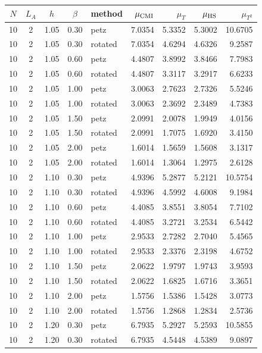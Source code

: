 \documentclass[11pt]{article}
\begin{document}
\begin{table}[htbp]
\centering
\scriptsize
\begin{tabular}{cccclrrrr}
\toprule
$N$ & $L_A$ & $h$ & $\beta$ & method & $\mu_{\rm CMI}$ & $\mu_T$ & $\mu_{\rm HS}$ & $\mu_{T^2}$\\
\midrule
10 & 2 & 1.05 & 0.30 & petz & 7.0354 & 5.3352 & 5.3002 & 10.6705\\
10 & 2 & 1.05 & 0.30 & rotated & 7.0354 & 4.6294 & 4.6326 & 9.2587\\
10 & 2 & 1.05 & 0.60 & petz & 4.4807 & 3.8992 & 3.8466 & 7.7983\\
10 & 2 & 1.05 & 0.60 & rotated & 4.4807 & 3.3117 & 3.2917 & 6.6233\\
10 & 2 & 1.05 & 1.00 & petz & 3.0063 & 2.7623 & 2.7326 & 5.5246\\
10 & 2 & 1.05 & 1.00 & rotated & 3.0063 & 2.3692 & 2.3489 & 4.7383\\
10 & 2 & 1.05 & 1.50 & petz & 2.0991 & 2.0078 & 1.9949 & 4.0156\\
10 & 2 & 1.05 & 1.50 & rotated & 2.0991 & 1.7075 & 1.6920 & 3.4150\\
10 & 2 & 1.05 & 2.00 & petz & 1.6014 & 1.5659 & 1.5608 & 3.1317\\
10 & 2 & 1.05 & 2.00 & rotated & 1.6014 & 1.3064 & 1.2975 & 2.6128\\
10 & 2 & 1.10 & 0.30 & petz & 4.9396 & 5.2877 & 5.2121 & 10.5754\\
10 & 2 & 1.10 & 0.30 & rotated & 4.9396 & 4.5992 & 4.6008 & 9.1984\\
10 & 2 & 1.10 & 0.60 & petz & 4.4085 & 3.8551 & 3.8054 & 7.7102\\
10 & 2 & 1.10 & 0.60 & rotated & 4.4085 & 3.2721 & 3.2534 & 6.5442\\
10 & 2 & 1.10 & 1.00 & petz & 2.9533 & 2.7282 & 2.7040 & 5.4565\\
10 & 2 & 1.10 & 1.00 & rotated & 2.9533 & 2.3376 & 2.3198 & 4.6752\\
10 & 2 & 1.10 & 1.50 & petz & 2.0622 & 1.9797 & 1.9743 & 3.9593\\
10 & 2 & 1.10 & 1.50 & rotated & 2.0622 & 1.6825 & 1.6716 & 3.3651\\
10 & 2 & 1.10 & 2.00 & petz & 1.5756 & 1.5386 & 1.5428 & 3.0773\\
10 & 2 & 1.10 & 2.00 & rotated & 1.5756 & 1.2868 & 1.2834 & 2.5736\\
10 & 2 & 1.20 & 0.30 & petz & 6.7935 & 5.2927 & 5.2593 & 10.5855\\
10 & 2 & 1.20 & 0.30 & rotated & 6.7935 & 4.5448 & 4.5389 & 9.0897\\

\end{tabular}
\end{table}
\end{document}
